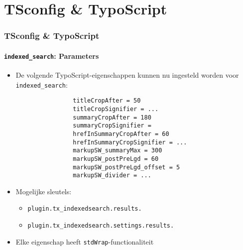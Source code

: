 %

\section{TSconfig \& TypoScript}

\begin{frame}[fragile]
	\frametitle{TSconfig \& TypoScript}
	\framesubtitle{\texttt{indexed\_search}: Parameters}

	\lstset{basicstyle=\tiny\ttfamily}

	\begin{itemize}
		\item De volgende TypoScript-eigenschappen kunnen nu ingesteld worden voor \texttt{indexed\_search}:

			\begin{lstlisting}
				titleCropAfter = 50
				titleCropSignifier = ...
				summaryCropAfter = 180
				summaryCropSignifier =
				hrefInSummaryCropAfter = 60
				hrefInSummaryCropSignifier = ...
				markupSW_summaryMax = 300
				markupSW_postPreLgd = 60
				markupSW_postPreLgd_offset = 5
				markupSW_divider = ...
			\end{lstlisting}

		\item Mogelijke sleutels:
			\begin{itemize}
				\item \texttt{plugin.tx\_indexedsearch.results.}
				\item \texttt{plugin.tx\_indexedsearch.settings.results.}
			\end{itemize}

		\item Elke eigenschap heeft \texttt{stdWrap}-functionaliteit

	\end{itemize}

\end{frame}


